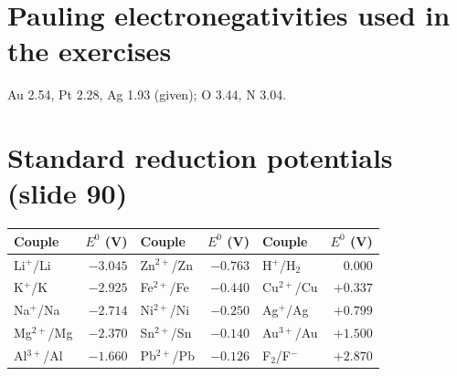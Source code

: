 \section{Pauling electronegativities used in the exercises}
Au 2.54, Pt 2.28, Ag 1.93 (given); O 3.44, N 3.04\extra.

\section{Standard reduction potentials (slide 90)}
\begin{center}
\small
\begin{tabular}{@{}lr|lr|lr@{}}
\toprule
Couple & $E^0$ (V) & Couple & $E^0$ (V) & Couple & $E^0$ (V) \\ \midrule
Li$^+$/Li & $-3.045$ & Zn$^{2+}$/Zn & $-0.763$ & H$^+$/H$_2$ & 0.000 \\
K$^+$/K & $-2.925$ & Fe$^{2+}$/Fe & $-0.440$ & Cu$^{2+}$/Cu & $+0.337$ \\
Na$^+$/Na & $-2.714$ & Ni$^{2+}$/Ni & $-0.250$ & Ag$^+$/Ag & $+0.799$ \\
Mg$^{2+}$/Mg & $-2.370$ & Sn$^{2+}$/Sn & $-0.140$ & Au$^{3+}$/Au & $+1.500$ \\
Al$^{3+}$/Al & $-1.660$ & Pb$^{2+}$/Pb & $-0.126$ & F$_2$/F$^-$ & $+2.870$ \\
\bottomrule
\end{tabular}
\end{center}
